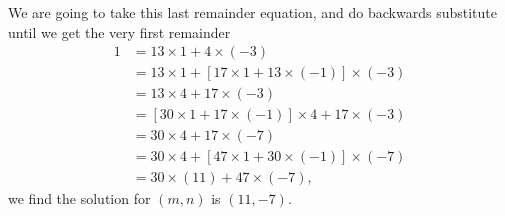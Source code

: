 \documentclass{report}
\newcommand{\f}[2]{\dfrac{#1}{#2}}
\begin{document}
We are going to take this last remainder equation, and do backwards substitute until we get the very first remainder
\begin{equation}
	\begin{aligned}
		1 & = 13 \times 1 + 4 \times (-3)                              \\
		& = 13 \times 1 + [17 \times 1 + 13 \times (-1)] \times (-3) \\
		& = 13 \times 4 +17 \times (-3)                              \\
		& = [30 \times 1 + 17 \times (-1)] \times 4 + 17 \times (-3) \\
		& = 30 \times 4 + 17 \times (-7)                             \\
		& = 30 \times 4 + [47 \times 1 + 30 \times (-1)] \times (-7) \\
		& = 30 \times (11) + 47 \times (-7),
	\end{aligned}
\end{equation}
we find the solution for $(m,n)$ is $(11,-7)$.
\end{document}
